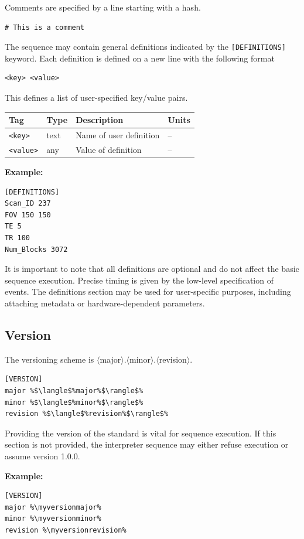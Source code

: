 \documentclass{article}
\def\myversionmajor{1}
\def\myversionminor{2}
\def\myversionrevision{0}
\begin{document}
Comments are specified by a line starting with a hash.
\begin{lstlisting}
# This is a comment
\end{lstlisting}

The sequence may contain general definitions indicated by the \verb.[DEFINITIONS]. keyword. Each definition is defined on a new line with the following format
\begin{lstlisting}
<key> <value>
\end{lstlisting}
This defines a list of user-specified key/value pairs.

\begin{tabularx}{\textwidth}{llXl}
\toprule
Tag & Type & Description & Units\\
\midrule
\verb.<key>. & text & Name of user definition & -- \\
\verb.<value>. & any & Value of definition & -- \\
\bottomrule
\end{tabularx}

\textbf{Example:}
\begin{lstlisting}
[DEFINITIONS]
Scan_ID 237
FOV 150 150
TE 5
TR 100
Num_Blocks 3072
\end{lstlisting}
It is important to note that all definitions are optional and do not affect the basic sequence execution. Precise timing is given by the low-level specification of events. The definitions section may be used for user-specific purposes, including attaching metadata or hardware-dependent parameters.

\subsection{Version}

The versioning scheme is $\langle$major$\rangle$.$\langle$minor$\rangle$.$\langle$revision$\rangle$.

\begin{lstlisting}[escapechar=\%]
[VERSION]
major %$\langle$%major%$\rangle$%
minor %$\langle$%minor%$\rangle$%
revision %$\langle$%revision%$\rangle$%
\end{lstlisting}

Providing the version of the standard is vital for sequence execution.
If this section is not provided, the interpreter sequence may either refuse execution or assume version 1.0.0.

\textbf{Example:}
\begin{lstlisting}[escapechar=\%]
[VERSION]
major %\myversionmajor%
minor %\myversionminor%
revision %\myversionrevision%
\end{lstlisting}
\end{document}
